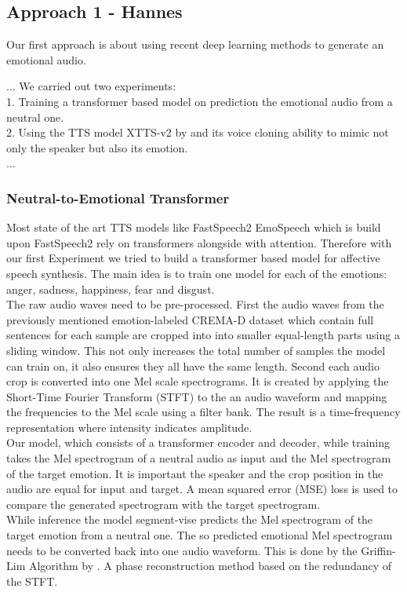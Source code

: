 \documentclass[11pt]{article}
\begin{document}
\subsection{Approach 1 - Hannes}
Our first approach is about using recent deep learning methods to generate an emotional audio. 
 
...
We carried out two experiments: \\
1. Training a transformer based model on prediction the emotional audio from a neutral one. \\
2. Using the TTS model XTTS-v2 by \cite{casanova2024xtts} and its voice cloning ability to mimic not only the speaker but also its emotion.\\
...
\subsubsection{Neutral-to-Emotional Transformer}
Most state of the art TTS models like FastSpeech2 \cite{ren2020fastspeech} EmoSpeech \cite{diatlova_emospeech_2023} which is build upon FastSpeech2 rely on transformers alongside with attention. Therefore with our first Experiment we tried to build a transformer based model for affective speech synthesis. The main idea is to train one model for each of the emotions: anger, sadness, happiness, fear and disgust. \\
The raw audio waves need to be pre-processed. First the audio waves from the previously mentioned emotion-labeled CREMA-D dataset \cite{cao_data} which contain full sentences for each sample are cropped into into smaller equal-length parts using a sliding window. This not only increases the total number of samples the model can train on, it also ensures they all have the same length. Second each audio crop is converted into one Mel scale spectrograms. It is created by applying the Short-Time Fourier Transform (STFT) to the an audio waveform and mapping the frequencies to the Mel scale using a filter bank. The result is a time-frequency representation where intensity indicates amplitude. \\
Our model, which consists of a transformer encoder and decoder, while training takes the Mel spectrogram of a neutral audio as input and the Mel spectrogram of the target emotion. It is important the speaker and the crop position in the audio are equal for input and target. A mean squared error (MSE) loss is used to compare the generated spectrogram with the target spectrogram. \\
While inference the model segment-vise predicts the Mel spectrogram of the target emotion from a neutral one. The so predicted emotional Mel spectrogram needs to be converted back into one audio waveform. This is done by the Griffin-Lim Algorithm by \cite{griffin1984lim} . A phase reconstruction method based on the redundancy of the STFT.     
\end{document}
